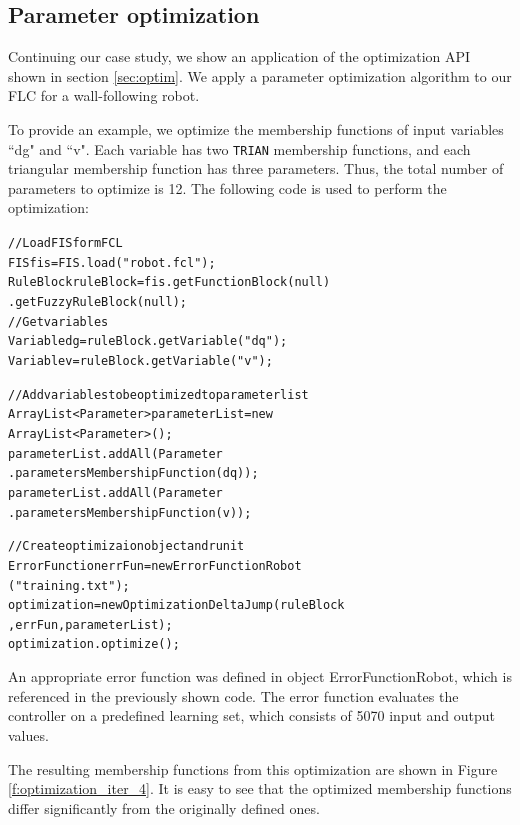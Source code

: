 \documentclass[11pt,twoside]{article}
\begin{document}
\begin{multicols}{2}
\subsection{Parameter optimization \label{sec:casOpt}}
Continuing our case study, we show an application of the optimization API shown in section \ref{sec:optim}. We apply a parameter optimization algorithm to our FLC for a wall-following robot.

To provide an example, we optimize the membership functions of input variables ``dg" and ``v". Each variable has two \texttt{TRIAN} membership functions, and each triangular membership function has three parameters. Thus, the total number of parameters to optimize is 12. The following code is used to perform the optimization:
\vspace*{4pt}
\begin{scriptsize}
\begin{alltt}
// Load FIS form FCL
FIS fis = FIS.load("robot.fcl");
RuleBlock ruleBlock = fis.getFunctionBlock(null)
                            .getFuzzyRuleBlock(null);
// Get variables
Variable dg = ruleBlock.getVariable("dq");
Variable v = ruleBlock.getVariable("v");

// Add variables to be optimized to parameter list
ArrayList<Parameter> parameterList = new 
                              ArrayList<Parameter>();
parameterList.addAll(Parameter
                  .parametersMembershipFunction(dq));
parameterList.addAll(Parameter
                  .parametersMembershipFunction(v));

// Create optimizaion object and run it
ErrorFunction errFun = new ErrorFunctionRobot
                                    ("training.txt");
optimization = new OptimizationDeltaJump(ruleBlock
                            , errFun, parameterList);
optimization.optimize();
\end{alltt}
\end{scriptsize}
\vspace*{4pt}

An appropriate error function was defined in object ErrorFunctionRobot, which is referenced in the previously shown code. The error function evaluates the controller on a predefined learning set, which consists of 5070 input and output values.

The resulting membership functions from this optimization are shown in Figure \ref{f:optimization_iter_4}. It is easy to see that the optimized membership functions differ significantly from the originally defined ones.


\end{multicols}
\end{document}
